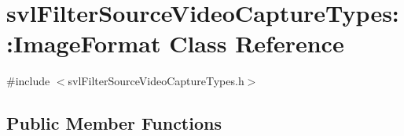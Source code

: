 \hypertarget{classsvl_filter_source_video_capture_types_1_1_image_format}{\section{svl\-Filter\-Source\-Video\-Capture\-Types\-:\-:Image\-Format Class Reference}
\label{classsvl_filter_source_video_capture_types_1_1_image_format}
}


{\ttfamily \#include $<$svl\-Filter\-Source\-Video\-Capture\-Types.\-h$>$}

\subsection*{Public Member Functions}
